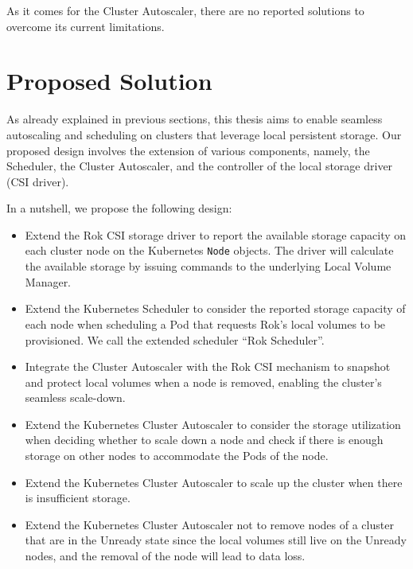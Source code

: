 As it comes for the Cluster Autoscaler, there are no reported solutions to
overcome its current limitations.

\section{Proposed Solution} \label{section:intro_proposed_solution}

As already explained in previous sections, this thesis aims to enable seamless
autoscaling and scheduling on clusters that leverage local persistent storage.
Our proposed design involves the extension of various components, namely, the
Scheduler, the Cluster Autoscaler, and the controller of the local storage
driver (CSI driver).

In a nutshell, we propose the following design:

\begin{itemize}
      \item Extend the Rok CSI storage driver to report the available storage
            capacity on each cluster node on the Kubernetes \texttt{Node}
            objects. The driver will calculate the available storage by issuing
            commands to the underlying Local Volume Manager.
      \item Extend the Kubernetes Scheduler to consider the reported storage
            capacity of each node when scheduling a Pod that requests Rok's
            local volumes to be provisioned. We call the extended scheduler
            ``Rok Scheduler''.
      \item Integrate the Cluster Autoscaler with the Rok CSI mechanism to
            snapshot and protect local volumes when a node is removed, enabling
            the cluster's seamless scale-down.
      \item Extend the Kubernetes Cluster Autoscaler to consider the storage
            utilization when deciding whether to scale down a node and check if
            there is enough storage on other nodes to accommodate the Pods of
            the node.
      \item Extend the Kubernetes Cluster Autoscaler to scale up the cluster
            when there is insufficient storage.
      \item Extend the Kubernetes Cluster Autoscaler not to remove nodes of a
            cluster that are in the Unready state since the local volumes still
            live on the Unready nodes, and the removal of the node will lead to
            data loss.

\end{itemize}

